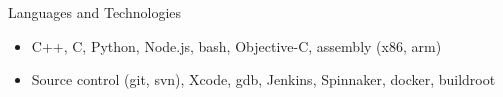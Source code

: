 \documentclass[]{mcdowellcv}
\begin{document}
	\begin{cvsection}{Languages and Technologies}
		\begin{cvsubsection}{}{}{}	
			\begin{itemize}
				\item C++, C, Python, Node.js, bash, Objective-C, assembly (x86, arm)
				\item Source control (git, svn), Xcode, gdb, Jenkins, Spinnaker, docker, buildroot
			\end{itemize}
		\end{cvsubsection}
	\end{cvsection}
	
\end{document}
